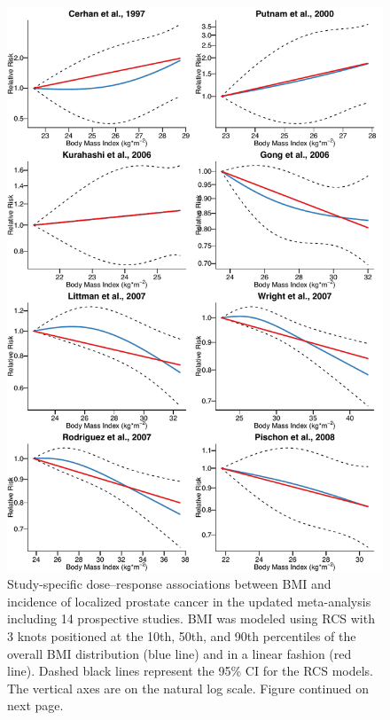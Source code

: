 \begin{figure}[p]
\centering
\includegraphics[width=\linewidth]{figures/ss_loc1.pdf}
\caption[Study-specific dose--response associations between BMI and incidence of localized prostate cancer]{Study-specific dose--response associations between BMI and incidence of localized prostate cancer in the updated meta-analysis including 14 prospective studies. BMI was modeled using RCS with 3 knots positioned at the 10th, 50th, and 90th percentiles of the overall BMI distribution (blue line) and in a linear fashion (red line). Dashed black lines represent the 95\% CI for the RCS models. The vertical axes are on the natural log scale. Figure continued on next page.}
\label{fig:ss_loc}
\end{figure}


